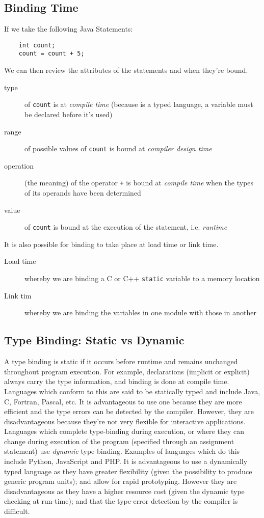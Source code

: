 \subsection{Binding Time}
If we take the following Java Statements:
\begin{verbatim}
    int count;
    count = count + 5;
\end{verbatim}
We can then review the attributes of the statements and when they're bound.
\begin{description}
    \item[type] of \verb|count| is at \textit{compile time} (because is a typed language, a variable must be declared before it's used)
    \item[range] of possible values of \verb|count| is bound at \textit{compiler design time} 
    \item[operation] (the meaning) of the operator \verb|+| is bound at \textit{compile time} when the types of its operands have been determined
    \item[value] of \verb|count| is bound at the execution of the statement, i.e. \textit{runtime}
\end{description}

It is also possible for binding to take place at load time or link time.
\begin{description}
    \item[Load time] whereby we are binding a C or C++ \verb|static| variable to a memory location
    \item[Link tim ] whereby we are binding the variables in one module with those in another
\end{description}

\subsection{Type Binding: Static vs Dynamic}
A type binding is static if it occurs before runtime and remains unchanged throughout program execution. For example, declarations (implicit or explicit) always carry the type information, and binding is done at compile time. Languages which conform to this are said to be statically typed and include Java, C, Fortran, Pascal, etc. It is advantageous to use one because they are more efficient and the type errors can be detected by the compiler. However, they are disadvantageous because they're not very flexible for interactive applications.\\

Languages which complete type-binding during execution, or where they can change during execution of the program (specified through an assignment statement) use \textit{dynamic} type binding. Examples of languages which do this include Python, JavaScript and PHP. It is advantageous to use a dynamically typed language as they have greater flexibility (given the possibility to produce generic program units); and allow for rapid prototyping. However they are disadvantageous as they have a higher resource cost (given the dynamic type checking at run-time); and that the type-error detection by the compiler is difficult.


